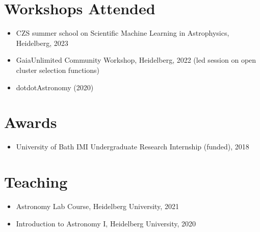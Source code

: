 \documentclass[12pt, letterpaper]{hunt-cv}
\begin{document}
\section*{Workshops Attended}

\begin{itemize}
    \item CZS summer school on Scientific Machine Learning in Astrophysics, Heidelberg, 2023
    \item GaiaUnlimited Community Workshop, Heidelberg, 2022 (led session on open cluster selection functions)
    \item dotdotAstronomy (2020)
\end{itemize}


\section*{Awards}

\begin{itemize}
    \item University of Bath IMI Undergraduate Research Internship (funded), 2018
\end{itemize}


\section*{Teaching}

\begin{itemize}
    \item Astronomy Lab Course, Heidelberg University, 2021
    \item Introduction to Astronomy I, Heidelberg University, 2020
\end{itemize}





\end{document}
